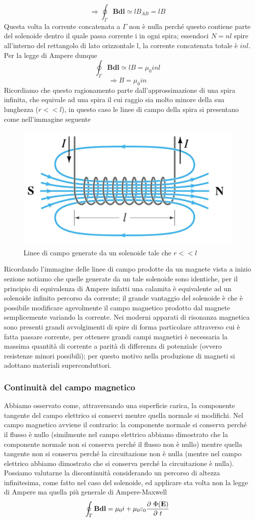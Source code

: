 \documentclass[
10pt, %
a4paper, %
oneside, %
headinclude,footinclude, %
BCOR5mm, %
]{scrartcl}
\begin{document}
\FloatBarrier
\[\Rightarrow \oint_{\Gamma}\mathbf{B}\mathbf{dl}\simeq lB_{AB}= lB\]
Questa volta la corrente concatenata a $\Gamma$ non è nulla perché questo contiene parte del solenoide dentro il quale passa corrente i in ogni spira; essendoci \(N = n l\) spire all'interno del rettangolo di lato orizzontale l, la corrente concatenata totale è \(inl\). Per la legge di Ampere dunque
\[\oint_{\Gamma}\mathbf{B}\mathbf{dl}\simeq lB= \mu_0 inl\]
\[\Rightarrow B = \mu_0 i n\]
Ricordiamo che questo ragionamento parte dall'approssimazione di una spira infinita, che equivale ad una spira il cui raggio sia molto minore della sua lunghezza (\(r<<l\)), in questo caso le linee di campo della spira si presentano come nell'immagine seguente
\begin{figure}[h!]
	\centering
	\includegraphics[width=0.6\linewidth]{images/linee_campo_solenoide}
	\caption{Linee di campo generate da un solenoide tale che \(r<<l\)}
	\label{fig:lineecamposolenoide}
\end{figure}
\FloatBarrier
Ricordando l'immagine delle linee di campo prodotte da un magnete vista a inizio sezione notiamo che quelle generate da un tale solenoide sono identiche, per il principio di equivalenza di Ampere infatti una calamita è equivalente ad un solenoide infinito percorso da corrente; il grande vantaggio del solenoide è che è possibile modificare agevolmente il campo magnetico prodotto dal magnete semplicemente variando la corrente. Nei moderni apparati di risonanza magnetica sono presenti grandi avvolgimenti di spire di forma particolare attraverso cui è fatta passare corrente, per ottenere grandi campi magnetici è necessaria la massima quantità di corrente a parità di differenza di potenziale (ovvero resistenze minori possibili); per questo motivo nella produzione di magneti si adottano materiali superconduttori. 
\subsubsection{Continuità del campo magnetico}
Abbiamo osservato come, attraversando una superficie carica, la componente tangente del campo elettrico si conservi mentre quella normale si modifichi. Nel campo magnetico avviene il contrario: la componente normale si conserva perché il flusso è nullo (similmente nel campo elettrico abbiamo dimostrato che la componente normale non si conserva perché il flusso non è nullo) mentre quella tangente non si conserva perché la circuitazione non è nulla (mentre nel campo elettrico abbiamo dimostrato che si conserva perché la circuitazione è nulla). Possiamo valutarne la discontinuità considerando un percorso di altezza infinitesima, come fatto nel caso del solenoide, ed applicare sta volta non la legge di Ampere ma quella più generale di Ampere-Maxwell
\[\oint_{\Gamma}\mathbf{B}\mathbf{dl}=\mu_0 i + \mu_0\varepsilon_0 \frac{\partial\  \Phi(\mathbf{E})}{\partial\  t}\]
\end{document}
